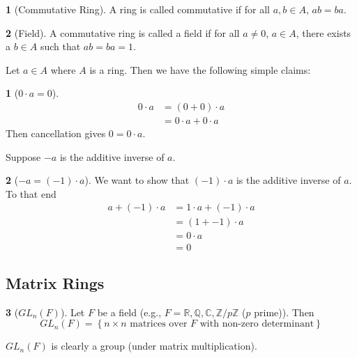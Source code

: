 \documentclass[12pt]{article}
\theoremstyle{definition}
\newtheorem{definition}{\color{NavyBlue}{\textbf{Definition}}}
\newtheorem{theorem}{\color{ForestGreen}{\textbf{Theorem}}}
\newcommand{\Z}{\mathbb{Z}}
\theoremstyle{definition}
\begin{document}
\begin{definition}[Commutative Ring]
	A ring is called commutative if for all $a,b \in A$, $ab = ba$. 
\end{definition}

\begin{definition}[Field]
	A commutative ring is called a field if for all $a \neq 0$, $a \in A$, there exists a $b \in A$ such that $ab = ba = 1$. 
\end{definition}

Let $a \in A$ where $A$ is a ring. Then we have the following simple claims:
\begin{theorem}[$0\cdot a = 0$]
	\begin{align*}
	0 \cdot a &= (0 + 0) \cdot a \tag{$0$ additive identity}\\
	&= 0\cdot a + 0 \cdot a \tag{distributivity} 
	\end{align*}
	Then cancellation gives $0 = 0 \cdot a$. 
\end{theorem}

Suppose $-a$ is the additive inverse of $a$.
\begin{theorem}[$-a = (-1)\cdot a$]
	We want to show that $(-1)\cdot a$ is the additive inverse of $a$. To that end
	\begin{align*}
		a + (-1)\cdot a &= 1 \cdot a + (-1) \cdot a \tag{$1$ multiplicative identity}\\
		&= (1 + -1) \cdot a \tag{distributivity}\\
		&= 0 \cdot a \\
		&= 0
	\end{align*}
\end{theorem}

\subsection{Matrix Rings}

\begin{definition}[$GL_n(F)$]
	Let $F$ be a field (e.g., $F = \mathbb{R}, \mathbb{Q}, \mathbb{C}, \Z / p\Z $ ($p$ prime)). Then
	\begin{equation}
		GL_n(F) = \left\{ n \times n \text{ matrices over $F$ with non-zero determinant}\right\}
	\end{equation}
\end{definition}

$GL_n(F)$ is clearly a group (under matrix multiplication).
\end{document}
